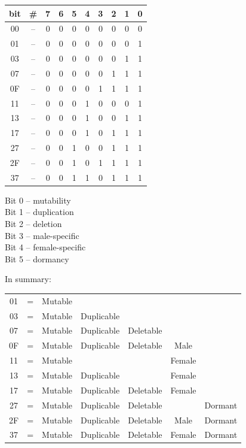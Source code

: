 \documentclass[11pt,twoside,a4paper]{article}
\begin{document}
\begin{minipage}[ht]{0.320\textwidth}
	\footnotesize
	\begin{tabular}[c]{ c c c c c c c c c c }
		bit & \# & 7 & 6 & 5 & 4 & 3 & 2 & 1 & 0 \\
		\hline
		00 & -- & 0 & 0 & 0 & 0 & 0 & 0 & 0 & 0 \\
		01 & -- & 0 & 0 & 0 & 0 & 0 & 0 & 0 & 1 \\
		03 & -- & 0 & 0 & 0 & 0 & 0 & 0 & 1 & 1 \\
		07 & -- & 0 & 0 & 0 & 0 & 0 & 1 & 1 & 1 \\
		0F & -- & 0 & 0 & 0 & 0 & 1 & 1 & 1 & 1 \\
		11 & -- & 0 & 0 & 0 & 1 & 0 & 0 & 0 & 1 \\
		13 & -- & 0 & 0 & 0 & 1 & 0 & 0 & 1 & 1 \\
		17 & -- & 0 & 0 & 0 & 1 & 0 & 1 & 1 & 1 \\
		27 & -- & 0 & 0 & 1 & 0 & 0 & 1 & 1 & 1 \\
		2F & -- & 0 & 0 & 1 & 0 & 1 & 1 & 1 & 1 \\
		37 & -- & 0 & 0 & 1 & 1 & 0 & 1 & 1 & 1  \\	
	\end{tabular}
\end{minipage} \hfill \begin{minipage}[ht]{0.165\textwidth}
	\footnotesize
	Bit 0 -- mutability ~\\
	Bit 1 -- duplication ~\\
	Bit 2 -- deletion ~\\
	Bit 3 -- male-specific ~\\
	Bit 4 -- female-specific ~\\
	Bit 5 -- dormancy ~\\
\end{minipage} \hfill \begin{minipage}[ht]{0.495\textwidth}
	\footnotesize
	In summary: ~\\
	\begin{tabular}[c]{ c c c c c c c }
		01	&	=	&	Mutable	&				&				&			&			\\
		03	&	=	&	Mutable	&	Duplicable	&				&			&			\\
		07	&	=	&	Mutable	&	Duplicable	&	Deletable	&			&			\\
		0F	&	=	&	Mutable	&	Duplicable	&	Deletable	&	Male	&			\\
		11	&	=	&	Mutable	&				&				&	Female	&			\\
		13	&	=	&	Mutable	&	Duplicable	&				&	Female	&			\\
		17	&	=	&	Mutable	&	Duplicable	&	Deletable	&	Female	&			\\
		27	&	=	&	Mutable	&	Duplicable	&	Deletable	&			&	Dormant	\\
		2F	&	=	&	Mutable	&	Duplicable	&	Deletable	&	Male	&	Dormant	\\
		37	&	=	&	Mutable	&	Duplicable	&	Deletable	&	Female	&	Dormant	\\
	\end{tabular} ~\\
\end{minipage} ~\\
\end{document}
